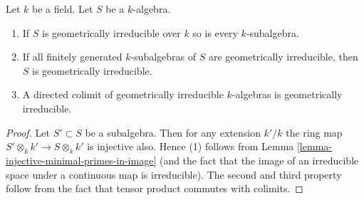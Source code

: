 \begin{lemma}
\label{lemma-subalgebra-geometrically-irreducible}
Let $k$ be a field. Let $S$ be a $k$-algebra.
\begin{enumerate}
\item If $S$ is geometrically irreducible over $k$ so is every
$k$-subalgebra.
\item If all finitely generated $k$-subalgebras of $S$ are
geometrically irreducible, then $S$ is geometrically irreducible.
\item A directed colimit of geometrically irreducible $k$-algebras
is geometrically irreducible.
\end{enumerate}
\end{lemma}

\begin{proof}
Let $S' \subset S$ be a subalgebra. Then for any extension $k'/k$
the ring map $S' \otimes_k k' \to S \otimes_k k'$ is injective also.
Hence (1) follows from Lemma \ref{lemma-injective-minimal-primes-in-image}
(and the fact that the image of an irreducible space under a continuous
map is irreducible). The second and third property follow from the fact
that tensor product commutes with colimits.
\end{proof}